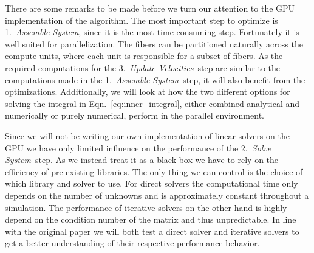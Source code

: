 There are some remarks to be made before we turn our attention to the GPU implementation of the algorithm. The most important step to optimize is 1.~\emph{Assemble System}, since it is the most time consuming step. Fortunately it is well suited for parallelization. The fibers can be partitioned naturally across the compute units, where each unit is responsible for a subset of fibers. As the required computations for the 3.~\emph{Update Velocities}~step are similar to the computations made in the 1.~\emph{Assemble System}~step, it will also benefit from the optimizations. Additionally, we will look at how the two different options for solving the integral in Eqn.~\ref{eq:inner_integral}, either combined analytical and numerically or purely numerical, perform in the parallel environment.

Since we will not be writing our own implementation of linear solvers on the GPU we have only limited influence on the performance of the 2.~\emph{Solve System}~step. As we instead treat it as a black box we have to rely on the efficiency of pre-existing libraries. The only thing we can control is the choice of which library and solver to use. For direct solvers the computational time only depends on the number of unknowns and is approximately constant throughout a simulation. The performance of iterative solvers on the other hand is highly depend on the condition number of the matrix and thus unpredictable. In line with the original paper we will both test a direct solver and iterative solvers to get a better understanding of their respective performance behavior.

